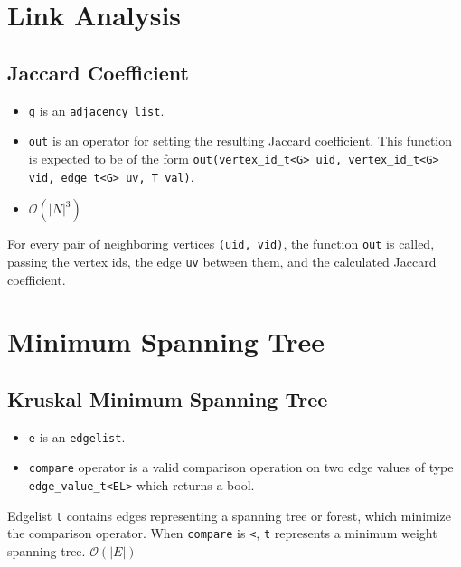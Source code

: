 \section{Link Analysis}


\subsection{Jaccard Coefficient}
{\small
      
}
\begin{itemdescr}
      \pnum\preconditions
      \begin{itemize}
            \item
              \lstinline{g} is an \lstinline{adjacency_list}.
            \item
              \lstinline{out} is an operator for setting the resulting Jaccard coefficient. This function is expected to be of the form \lstinline{out(vertex_id_t<G> uid, vertex_id_t<G> vid, edge_t<G> uv, T val)}.
            \item
              \pnum\complexity $\mathcal{O}(|N|^3)$
      \end{itemize}
      \pnum\effects For every pair of neighboring vertices \lstinline{(uid, vid)}, the function \lstinline{out} is called, passing the vertex ids, the edge \lstinline{uv} between them, and the calculated Jaccard coefficient.
\end{itemdescr}

\section{Minimum Spanning Tree}

\subsection{Kruskal Minimum Spanning Tree}

{\small
      
}
\begin{itemdescr}
      \pnum\preconditions
      \begin{itemize}
            \item
                  \lstinline{e} is an \lstinline{edgelist}.
            \item
                  \lstinline{compare} operator is a valid comparison operation on two edge values of type \lstinline{edge_value_t<EL>} which returns a bool.
      \end{itemize}
      \pnum\effects Edgelist \lstinline{t} contains edges representing a spanning tree or forest, which minimize the comparison operator. When \lstinline{compare} is \lstinline{<}, \lstinline{t} represents a minimum weight spanning tree.
      \pnum\complexity $\mathcal{O}(|E|)$
\end{itemdescr}

